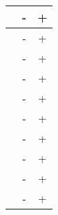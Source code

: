 \begin{center}
\begin{supertabular}{|c|c|c|}
           &         -       &          +         \\ \hline
{}          &         -       &          +          \\ \hline
{}            &         -       &          +          \\ \hline
{}           &         -       &          +         \\ \hline
{}   &         -       &          +     \\ \hline
{}            &         -       &          +          \\ \hline
{}      &         -       &          +      \\ \hline
{}                  &         -       &          +         \\ \hline
{}                   &         -       &          +          \\ \hline
{}                  &         -       &          +         \\ \hline
\hline
\end{supertabular}
\end{center}
